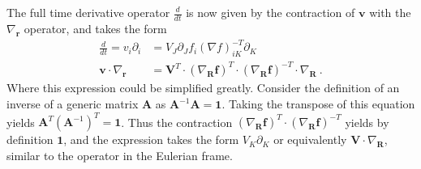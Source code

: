 \documentclass[12pt,a4paper]{article}
\begin{document}

The full time derivative operator $\tfrac{d}{dt}$ is now given by the contraction of $\bm{v}$ with the $\nabla_{\bm{r}}$ operator, and takes the form
\begin{equation}\label{eq:full_time_derivative}
  \begin{split}
     \frac{d}{dt}=v_i\partial_i  & = V_J\partial_J f_i  \left(\nabla f\right)^{-T}_{iK} \partial_K\\
     \bm{v} \cdot \nabla_{\bm{r}}  & = \bm{V}^{T} \cdot \left(\nabla_{\bm{R}} \bm{f}\right)^T \cdot  \left(\nabla_{\bm{R}} \bm{f}\right)^{-T} \cdot \nabla_{\bm{R}} \ .
  \end{split}
\end{equation}
Where this expression could be simplified greatly. Consider the definition of an inverse of a generic matrix $\bm{A}$ as $\bm{A}^{-1} \bm{A} = \bm{1}$. Taking the transpose of this equation yields $\bm{A}^{T}\left(\bm{A}^{-1}\right)^{T}  = \bm{1}$. Thus the contraction $\left(\nabla_{\bm{R}} \bm{f}\right)^T \cdot  \left(\nabla_{\bm{R}} \bm{f}\right)^{-T}$ yields by definition $\bm{1}$, and the expression takes the form $V_K\partial_K$ or equivalently $\bm{V}\cdot \nabla_{\bm{R}}$, similar to the operator in the Eulerian frame.
\end{document}
